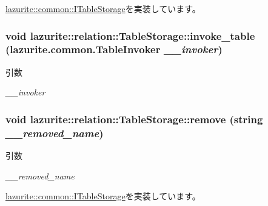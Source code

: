 \hyperlink{interfacelazurite_1_1common_1_1_i_table_storage_af50cc04c6deb3b470182f1f076355526}{lazurite::common::ITableStorage}を実装しています。\hypertarget{classlazurite_1_1relation_1_1_table_storage_a05912e12da13da956ae1ea91999e2074}{
\subsubsection[{invoke\_\-table}]{\setlength{\rightskip}{0pt plus 5cm}void lazurite::relation::TableStorage::invoke\_\-table (lazurite.common.TableInvoker {\em \_\-\_\-invoker})}}
\label{classlazurite_1_1relation_1_1_table_storage_a05912e12da13da956ae1ea91999e2074}

\begin{DoxyParams}{引数}
\item[{\em \_\-\_\-invoker}]\end{DoxyParams}
\hypertarget{classlazurite_1_1relation_1_1_table_storage_a68dfa6f296ed84619e4202458fdc22b9}{
\subsubsection[{remove}]{\setlength{\rightskip}{0pt plus 5cm}void lazurite::relation::TableStorage::remove (string {\em \_\-\_\-removed\_\-name})}}
\label{classlazurite_1_1relation_1_1_table_storage_a68dfa6f296ed84619e4202458fdc22b9}

\begin{DoxyParams}{引数}
\item[{\em \_\-\_\-removed\_\-name}]\end{DoxyParams}


\hyperlink{interfacelazurite_1_1common_1_1_i_table_storage_abb90f2c62e425951cebd5cd5067a005a}{lazurite::common::ITableStorage}を実装しています。

